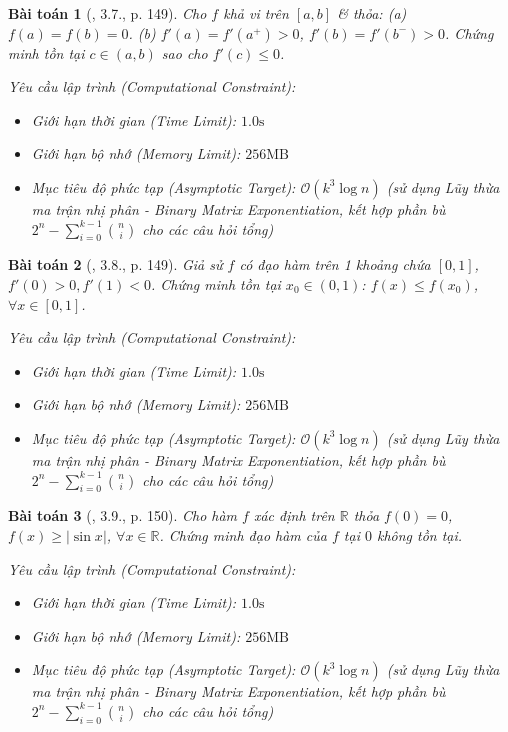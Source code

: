 \documentclass{article}
\newtheorem{baitoan}{Bài toán}
\begin{document}
\begin{baitoan}[\cite{Quoc_Long_Dat_Nam_VMC}, 3.7., p. 149]
	Cho $f$ khả vi trên $[a,b]$ \& thỏa: (a) $f(a) = f(b) = 0$. (b) $f'(a) = f'(a^+) > 0$, $f'(b) = f'(b^-) > 0$. Chứng minh tồn tại $c\in(a,b)$ sao cho $f'(c)\le0$.

    \vspace{0.5em}
    \emph{Yêu cầu lập trình (Computational Constraint):}
    \begin{itemize}
        \item Giới hạn thời gian (Time Limit): $1.0\mathrm{s}$
        \item Giới hạn bộ nhớ (Memory Limit): $256\mathrm{MB}$
        \item Mục tiêu độ phức tạp (Asymptotic Target): $\mathcal{O}(k^3 \log n)$ (sử dụng Lũy thừa ma trận nhị phân - Binary Matrix Exponentiation, kết hợp phần bù $2^n - \sum_{i=0}^{k-1} \binom{n}{i}$ cho các câu hỏi tổng)
    \end{itemize}
\end{baitoan}


\begin{baitoan}[\cite{Quoc_Long_Dat_Nam_VMC}, 3.8., p. 149]
	Giả sử $f$ có đạo hàm trên 1 khoảng chứa $[0,1]$, $f'(0) > 0,f'(1) < 0$. Chứng minh tồn tại $x_0\in(0,1)$: $f(x)\le f(x_0)$, $\forall x\in[0,1]$.

    \vspace{0.5em}
    \emph{Yêu cầu lập trình (Computational Constraint):}
    \begin{itemize}
        \item Giới hạn thời gian (Time Limit): $1.0\mathrm{s}$
        \item Giới hạn bộ nhớ (Memory Limit): $256\mathrm{MB}$
        \item Mục tiêu độ phức tạp (Asymptotic Target): $\mathcal{O}(k^3 \log n)$ (sử dụng Lũy thừa ma trận nhị phân - Binary Matrix Exponentiation, kết hợp phần bù $2^n - \sum_{i=0}^{k-1} \binom{n}{i}$ cho các câu hỏi tổng)
    \end{itemize}
\end{baitoan}


\begin{baitoan}[\cite{Quoc_Long_Dat_Nam_VMC}, 3.9., p. 150]
	Cho hàm $f$ xác định trên $\mathbb{R}$ thỏa $f(0) = 0$, $f(x)\ge|\sin x|$, $\forall x\in\mathbb{R}$. Chứng minh đạo hàm của $f$ tại $0$ không tồn tại.

    \vspace{0.5em}
    \emph{Yêu cầu lập trình (Computational Constraint):}
    \begin{itemize}
        \item Giới hạn thời gian (Time Limit): $1.0\mathrm{s}$
        \item Giới hạn bộ nhớ (Memory Limit): $256\mathrm{MB}$
        \item Mục tiêu độ phức tạp (Asymptotic Target): $\mathcal{O}(k^3 \log n)$ (sử dụng Lũy thừa ma trận nhị phân - Binary Matrix Exponentiation, kết hợp phần bù $2^n - \sum_{i=0}^{k-1} \binom{n}{i}$ cho các câu hỏi tổng)
    \end{itemize}
\end{baitoan}
\end{document}
